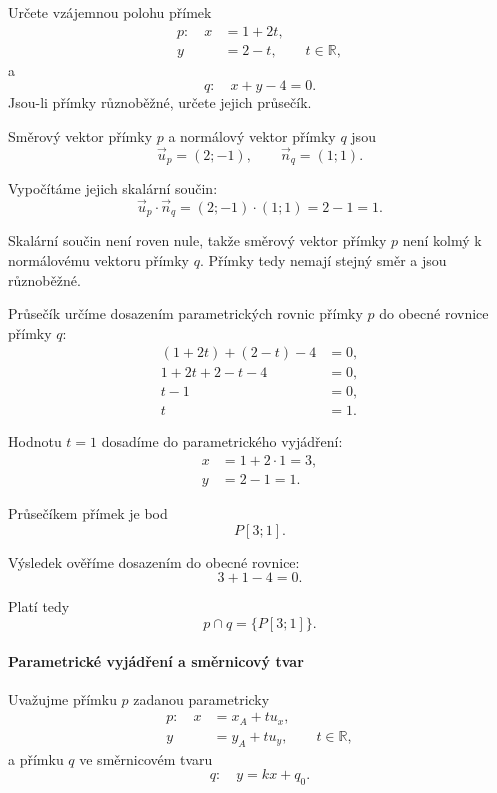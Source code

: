 \begin{example}\label{exa:Mixed_parametric_general_intersection}
    Určete vzájemnou polohu přímek
    \[
        \begin{aligned}
            p:\quad x&=1+2t,\\
                     y&=2-t,
                     \qquad t\in\mathbb{R},
        \end{aligned}
    \]
    a
    \[
        q:\quad x+y-4=0.
    \]
    Jsou-li přímky různoběžné, určete jejich průsečík.

    Směrový vektor přímky $p$ a normálový vektor přímky $q$ jsou
    \[
        \vec{u}_p=(2;-1),
        \qquad
        \vec{n}_q=(1;1).
    \]

    Vypočítáme jejich skalární součin:
    \[
        \vec{u}_p\cdot\vec{n}_q
        =
        (2;-1)\cdot(1;1)
        =
        2-1
        =
        1.
    \]

    Skalární součin není roven nule, takže směrový vektor přímky $p$
    není kolmý k normálovému vektoru přímky $q$. Přímky tedy nemají
    stejný směr a jsou různoběžné.

    Průsečík určíme dosazením parametrických rovnic přímky $p$ do
    obecné rovnice přímky $q$:
    \begin{align*}
        (1+2t)+(2-t)-4&=0,\\
        1+2t+2-t-4&=0,\\
        t-1&=0,\\
        t&=1.
    \end{align*}

    Hodnotu $t=1$ dosadíme do parametrického vyjádření:
    \begin{align*}
        x&=1+2\cdot1=3,\\
        y&=2-1=1.
    \end{align*}

    Průsečíkem přímek je bod
    \[
        P[3;1].
    \]

    Výsledek ověříme dosazením do obecné rovnice:
    \[
        3+1-4=0.
    \]

    Platí tedy
    \[
        p\cap q=\{P[3;1]\}.
    \]
\end{example}


\paragraph{Parametrické vyjádření a směrnicový tvar}

Uvažujme přímku $p$ zadanou parametricky
\begin{equation}\label{eq:Mixed_parametric_slope_p}
    \begin{aligned}
        p:\quad x&=x_A+t u_x,\\
                 y&=y_A+t u_y,
                 \qquad t\in\mathbb{R},
    \end{aligned}
\end{equation}
a přímku $q$ ve směrnicovém tvaru
\begin{equation}\label{eq:Mixed_parametric_slope_q}
    q:\quad y=kx+q_0.
\end{equation}

